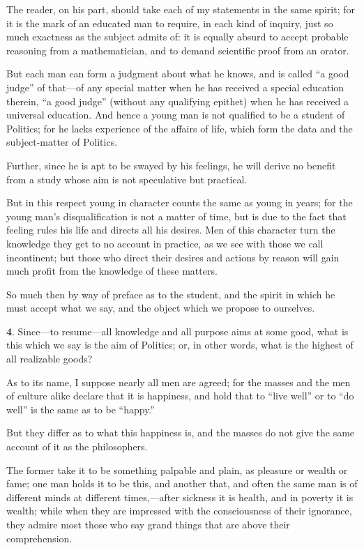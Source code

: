 The reader, on his part, should take each of my statements in the same
spirit; for it is the mark of an educated man to require, in each kind
of inquiry, just so much exactness as the subject admits of: it is
equally absurd to accept probable reasoning from a mathematician, and
to demand scientific proof from an orator.

But each man can form a judgment about what he knows, and is called
``a good judge'' of that---of any special matter when he has received
a special education therein, ``a good judge'' (without any qualifying
epithet) when he has received a universal education. And hence a young
man is not qualified to be a student of Politics; for he lacks
experience of the affairs of life, which form the data and the
subject-matter of Politics.

Further, since he is apt to be swayed by his feelings, he will derive
no benefit from a study whose aim is not speculative but practical.

But in this respect young in character counts the same as young in
years; for the young man's disqualification is not a matter of time,
but is due to the fact that feeling rules his life and directs all his
desires. Men of this character turn the knowledge  they get to
no account in practice, as we see with those we call incontinent; but
those who direct their desires and actions by reason will gain much
profit from the knowledge of these matters.

So much then by way of preface as to the student, and the spirit in
which he must accept what we say, and the object which we propose to
ourselves.

\textbf{4}. Since---to re\-sume---all knowledge and all purpose aims
at some good, what is this which we say is the aim of Politics; or, in
other words, what is the highest of all realizable goods?

As to its name, I suppose nearly all men are agreed; for the masses
and the men of culture alike declare that it is happiness, and hold
that to ``live well'' or to ``do well'' is the same as to be
``happy.''

But they differ as to what this happiness is, and the masses do not
give the same account of it as the philosophers.

The former take it to be something palpable and plain, as pleasure or
wealth or fame; one man holds it to be this, and another that, and
often the same man is of different minds at different times,---af\-ter
sickness it is health, and in poverty it is wealth; while when they
are impressed with the consciousness of their ignorance, they admire
most those who say grand things that are above their comprehension.


